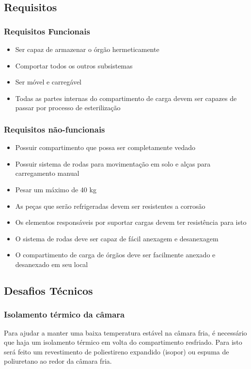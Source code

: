 \subsection{Requisitos}

\subsubsection{Requisitos Funcionais}
\begin{itemize}
\item Ser capaz de armazenar o órgão hermeticamente
\item Comportar todos os outros subsistemas
\item Ser móvel e carregável
\item Todas as partes internas do compartimento de carga devem ser capazes de passar por processo de esterilização
\end{itemize}

\subsubsection{Requisitos não-funcionais}

\begin{itemize}
\item Possuir compartimento que possa ser completamente vedado
\item Possuir sistema de rodas para movimentação em solo e alças para carregamento manual
\item Pesar um máximo de 40 kg
\item As peças que serão refrigeradas devem ser resistentes a corrosão
\item Os elementos responsáveis por suportar cargas devem ter resistência para isto
\item O sistema de rodas deve ser capaz de fácil anexagem e desanexagem
\item O compartimento de carga de órgãos deve ser facilmente anexado e desanexado em seu local
\end{itemize}

\subsection{Desafios Técnicos}

\subsubsection{Isolamento térmico da câmara}
Para ajudar a manter uma baixa temperatura estável na câmara fria, é necessário que haja um isolamento térmico em volta do compartimento resfriado. Para isto será feito um revestimento de poliestireno expandido (isopor) ou espuma de poliuretano ao redor da câmara fria.

